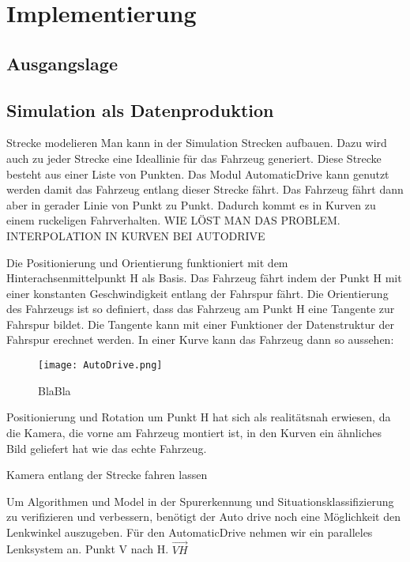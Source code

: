 
\chapter{Implementierung}

\section{Ausgangslage}

\section{Simulation als Datenproduktion}
Strecke modelieren
Man kann in der Simulation Strecken aufbauen. Dazu wird auch zu jeder Strecke eine Ideallinie für das Fahrzeug generiert.
Diese Strecke besteht aus einer Liste von Punkten.
Das Modul AutomaticDrive kann genutzt werden damit das Fahrzeug entlang dieser Strecke fährt.
Das Fahrzeug fährt dann aber in gerader Linie von Punkt zu Punkt. 
Dadurch kommt es in Kurven zu einem ruckeligen Fahrverhalten.
WIE LÖST MAN DAS PROBLEM. INTERPOLATION IN KURVEN BEI AUTODRIVE

Die Positionierung und Orientierung funktioniert mit dem Hinterachsenmittelpunkt H als Basis.
Das Fahrzeug fährt indem der Punkt H mit einer konstanten Geschwindigkeit entlang der Fahrspur fährt.
Die Orientierung des Fahrzeugs ist so definiert, dass das Fahrzeug am Punkt H eine Tangente zur Fahrspur bildet.
Die Tangente kann mit einer Funktioner der Datenstruktur der Fahrspur erechnet werden. 
In einer Kurve kann das Fahrzeug dann so aussehen:

\begin{wrapfigure}{r}{.4\textwidth}
    \centering
    \texttt{[image: AutoDrive.png]}
    \vspace{-15pt}
    \caption{BlaBla\footnotemark}
\end{wrapfigure}

Positionierung und Rotation um Punkt H hat sich als realitätsnah erwiesen, da die Kamera, die vorne am Fahrzeug montiert ist, in den Kurven ein ähnliches Bild geliefert hat wie das echte Fahrzeug.


Kamera entlang der Strecke fahren lassen

Um Algorithmen und Model in der Spurerkennung und Situationsklassifizierung zu verifizieren und verbessern, 
benötigt der Auto drive noch eine Möglichkeit den Lenkwinkel auszugeben.
Für den AutomaticDrive nehmen wir ein paralleles Lenksystem an.
Punkt V nach H. $\vec{VH}$ 

